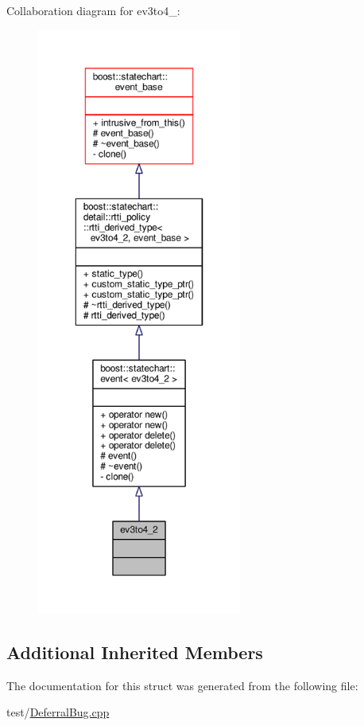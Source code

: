 Collaboration diagram for ev3to4\+\_\+:
\nopagebreak
\begin{figure}[H]
\begin{center}
\leavevmode
\includegraphics[height=550pt]{structev3to4__2__coll__graph}
\end{center}
\end{figure}
\subsection*{Additional Inherited Members}


The documentation for this struct was generated from the following file\+:\begin{DoxyCompactItemize}
\item 
test/\mbox{\hyperlink{_deferral_bug_8cpp}{Deferral\+Bug.\+cpp}}\end{DoxyCompactItemize}
